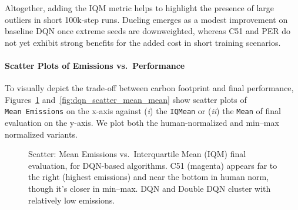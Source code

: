 Altogether, adding the IQM metric helps to highlight the presence of large outliers
in short 100k‐step runs. Dueling emerges as a modest improvement on baseline DQN
once extreme seeds are downweighted, whereas C51 and PER do not yet exhibit 
strong benefits for the added cost in short training scenarios.


\paragraph{Scatter Plots of Emissions vs.\ Performance}
To visually depict the trade-off between carbon footprint and final performance,
Figures~\ref{fig:dqn_scatter_mean_iqm} and~\ref{fig:dqn_scatter_mean_mean} 
show scatter plots of \texttt{Mean~Emissions} on the x-axis against 
(\emph{i}) the \texttt{IQMean} or 
(\emph{ii}) the \texttt{Mean} of final evaluation on the y-axis. 
We plot both the human-normalized and min--max normalized variants.

\begin{figure}
	\centering
	\quad
	\caption{Scatter: Mean Emissions vs.\ Interquartile Mean (IQM) final evaluation, for DQN-based algorithms. 
		C51 (magenta) appears far to the right (highest emissions) 
		and near the bottom in human norm, though it's closer in min--max. 
		DQN and Double DQN cluster with relatively low emissions.}
	\label{fig:dqn_scatter_mean_iqm}
\end{figure}

